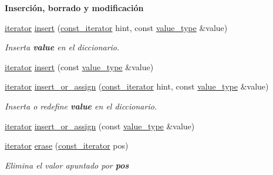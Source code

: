 \begin{Indent}{\bf Inserción, borrado y modificación}\par
\begin{DoxyCompactItemize}
\item 
\hyperlink{classaed2_1_1map_1_1iterator}{iterator} \hyperlink{classaed2_1_1map_a6941cde9a79c27f054b5c97a587a1854_a6941cde9a79c27f054b5c97a587a1854}{insert} (\hyperlink{classaed2_1_1map_1_1const__iterator}{const\-\_\-iterator} hint, const \hyperlink{classaed2_1_1map_a719db98e0ff9a837610f76be33264680_a719db98e0ff9a837610f76be33264680}{value\-\_\-type} \&value)
\begin{DoxyCompactList}\small\item\em Inserta {\bfseries value} en el diccionario. \end{DoxyCompactList}\item 
\hyperlink{classaed2_1_1map_1_1iterator}{iterator} \hyperlink{classaed2_1_1map_a60aacba06b1579630b3c8e996cf248c8_a60aacba06b1579630b3c8e996cf248c8}{insert} (const \hyperlink{classaed2_1_1map_a719db98e0ff9a837610f76be33264680_a719db98e0ff9a837610f76be33264680}{value\-\_\-type} \&value)
\item 
\hyperlink{classaed2_1_1map_1_1iterator}{iterator} \hyperlink{classaed2_1_1map_a2ef6723c183916276b0afc4a4c721475_a2ef6723c183916276b0afc4a4c721475}{insert\-\_\-or\-\_\-assign} (\hyperlink{classaed2_1_1map_1_1const__iterator}{const\-\_\-iterator} hint, const \hyperlink{classaed2_1_1map_a719db98e0ff9a837610f76be33264680_a719db98e0ff9a837610f76be33264680}{value\-\_\-type} \&value)
\begin{DoxyCompactList}\small\item\em Inserta o redefine {\bfseries value} en el diccionario. \end{DoxyCompactList}\item 
\hyperlink{classaed2_1_1map_1_1iterator}{iterator} \hyperlink{classaed2_1_1map_a9128a806713bcc999ebd8a97ab77e765_a9128a806713bcc999ebd8a97ab77e765}{insert\-\_\-or\-\_\-assign} (const \hyperlink{classaed2_1_1map_a719db98e0ff9a837610f76be33264680_a719db98e0ff9a837610f76be33264680}{value\-\_\-type} \&value)
\item 
\hyperlink{classaed2_1_1map_1_1iterator}{iterator} \hyperlink{classaed2_1_1map_ad8e796bf9c9c558e5ce6b61e116253fe_ad8e796bf9c9c558e5ce6b61e116253fe}{erase} (\hyperlink{classaed2_1_1map_1_1const__iterator}{const\-\_\-iterator} pos)
\begin{DoxyCompactList}\small\item\em Elimina el valor apuntado por {\bfseries pos} \end{DoxyCompactList}\item 

\end{DoxyCompactItemize}
\end{Indent}

